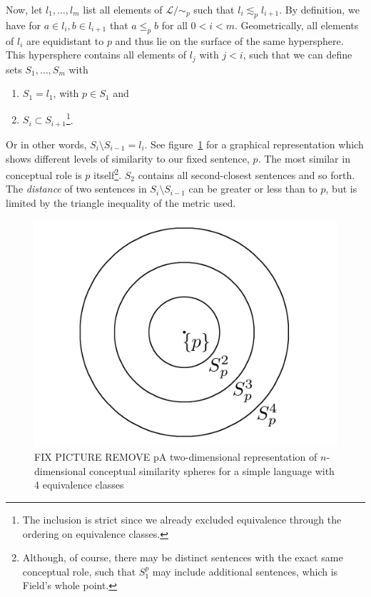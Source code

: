 \documentclass[11pt, a4paper]{scrartcl}
\renewcommand{\i}[1]{\emph{#1}}
\renewcommand{\L}{\mathcal{L}}
\begin{document}
Now, let $l_1, \ldots, l_m$ list all elements of $\L/\!\sim_p$ such that $l_i \lesssim_p l_{i+1}$. By definition, we have for $a \in l_i, b \in l_{i+1}$ that $a \leqslant_p b$ for all $0 < i < m$. Geometrically, all elements of $l_i$ are equidistant to $p$ and thus lie on the surface of the same hypersphere. This hypersphere contains all elements of $l_j$ with $j < i$, such that we can define sets $S_1, \ldots, S_m$ with 
\begin{enumerate}[label = (\roman*)]
    \item $S_1 = l_1$, with $p \in S_1$ and 
    \item $S_i \subset S_{i+1}$\footnote{The inclusion is strict since we already excluded equivalence through the ordering on equivalence classes.}. 
\end{enumerate}
Or in other words, $S_i \setminus S_{i-1} = l_i$. See figure~\ref{fig:spheres} for a graphical representation which shows different levels of similarity to our fixed sentence, $p$. The most similar in conceptual role is $p$ itself\footnote{Although, of course, there may be distinct sentences with the exact same conceptual role,  such that $S_1^p$ may include additional sentences, which is Field's whole point.}. $S_2$ contains all second-closest sentences and so forth. The \i{distance} of two sentences in $S_i\setminus S_{i-1}$ can be greater or less than to $p$, but is limited by the triangle inequality of the metric used.  

\begin{figure}
	\centering
    \includegraphics[width=\textwidth]{Similarityspheres.png}
    \caption{{\color{red} FIX PICTURE REMOVE p}A two-dimensional representation of $n$-dimensional conceptual similarity spheres for a simple language with 4 equivalence classes\label{fig:spheres}}
\end{figure}
\end{document}
